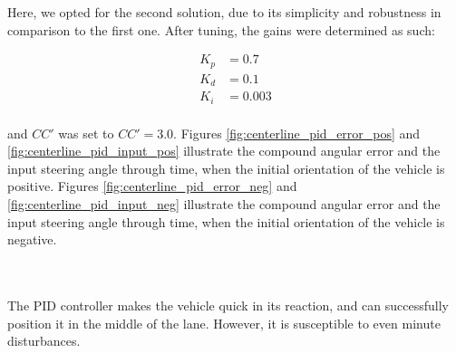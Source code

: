 Here, we opted for the second solution, due to its simplicity and robustness
in comparison to the first one. After tuning, the gains were determined as such:

\begin{align*}
  K_p &= 0.7 \\
  K_d &= 0.1 \\
  K_i &= 0.003 \\
\end{align*}

and $CC'$ was set to $CC' = 3.0$. Figures \ref{fig:centerline_pid_error_pos} and
\ref{fig:centerline_pid_input_pos} illustrate the compound angular error
and the input steering angle through time, when the initial orientation of the
vehicle is positive. Figures \ref{fig:centerline_pid_error_neg} and
\ref{fig:centerline_pid_input_neg} illustrate the compound angular error
and the input steering angle through time, when the initial orientation of the
vehicle is negative.



\noindent{}\\

\noindent{}\\

The PID controller makes the vehicle quick in its reaction, and can
successfully position it in the middle of the lane. However, it is
susceptible to even minute disturbances.

